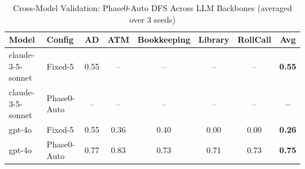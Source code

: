 \begin{table}[t]
\centering
\caption{Cross-Model Validation: Phase0-Auto DFS Across LLM Backbones (averaged over 3 seeds)}
\label{tab:cross_model}
\begin{tabular}{l l c c c c c c}
\toprule
\textbf{Model} & \textbf{Config} & \textbf{AD} & \textbf{ATM} & \textbf{Bookkeeping} & \textbf{Library} & \textbf{RollCall} & \textbf{Avg} \\
\midrule
claude-3-5-sonnet & Fixed-5 & 0.55 & -- & -- & -- & -- & \textbf{0.55} \\
claude-3-5-sonnet & Phase0-Auto & -- & -- & -- & -- & -- & \textbf{--} \\
\midrule
gpt-4o & Fixed-5 & 0.55 & 0.36 & 0.40 & 0.00 & 0.00 & \textbf{0.26} \\
gpt-4o & Phase0-Auto & 0.77 & 0.83 & 0.73 & 0.71 & 0.73 & \textbf{0.75} \\
\bottomrule
\end{tabular}
\end{table}